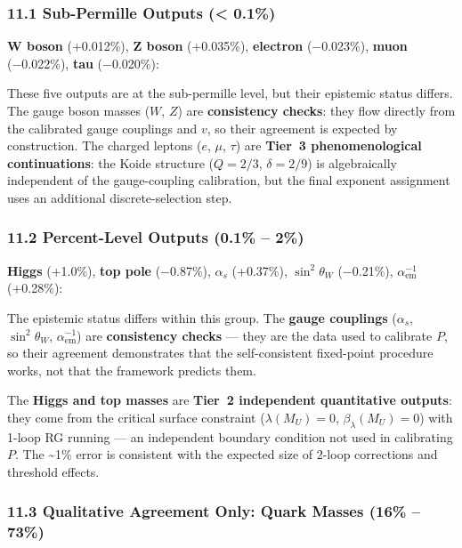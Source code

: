 \subsubsection{11.1 Sub-Permille Outputs (\textless{} 0.1\%)}\label{111-sub-permille-outputs--01}

\textbf{W boson} (+0.012\%), \textbf{Z boson} (+0.035\%), \textbf{electron} (−0.023\%), \textbf{muon} (−0.022\%), \textbf{tau} (−0.020\%):

These five outputs are at the sub-permille level, but their epistemic status differs. The gauge boson masses (\(W\), \(Z\)) are \textbf{consistency checks}: they flow directly from the calibrated gauge couplings and \(v\), so their agreement is expected by construction. The charged leptons (\(e\), \(\mu\), \(\tau\)) are \textbf{Tier~3 phenomenological continuations}: the Koide structure (\(Q = 2/3\), \(\delta = 2/9\)) is algebraically independent of the gauge-coupling calibration, but the final exponent assignment uses an additional discrete-selection step.

\subsubsection{11.2 Percent-Level Outputs (0.1\% -- 2\%)}\label{112-percent-level-outputs-01--2}

\textbf{Higgs} (+1.0\%), \textbf{top pole} (−0.87\%), \textbf{\(\alpha_s\)} (+0.37\%), \textbf{\(\sin^2\theta_W\)} (−0.21\%), \textbf{\(\alpha_{\text{em}}^{-1}\)} (+0.28\%):

The epistemic status differs within this group. The \textbf{gauge couplings} (\(\alpha_s\), \(\sin^2\theta_W\), \(\alpha_{\text{em}}^{-1}\)) are \textbf{consistency checks} --- they are the data used to calibrate \(P\), so their agreement demonstrates that the self-consistent fixed-point procedure works, not that the framework predicts them.

The \textbf{Higgs and top masses} are \textbf{Tier~2 independent quantitative outputs}: they come from the critical surface constraint (\(\lambda(M_U) = 0\), \(\beta_\lambda(M_U) = 0\)) with 1-loop RG running --- an independent boundary condition not used in calibrating \(P\). The \textasciitilde1\% error is consistent with the expected size of 2-loop corrections and threshold effects.

\subsubsection{11.3 Qualitative Agreement Only: Quark Masses (16\% -- 73\%)}\label{113-qualitative-agreement-only-quark-masses-16--73}

